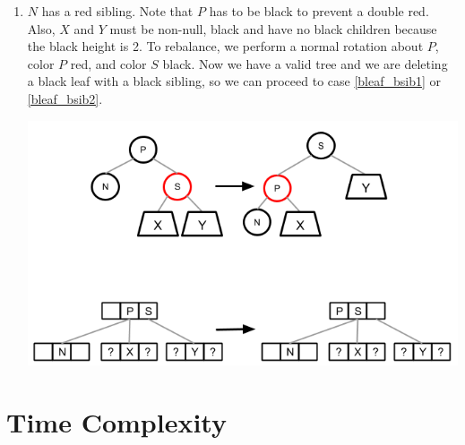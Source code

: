 \documentclass[12pt]{article}
\begin{document}
\begin{enumerate}
\begin{enumerate}
    \item $N$ has a red sibling. Note that $P$ has to be black to prevent a double red. Also, $X$ and $Y$ must be non-null, black and have no black children because the black height is 2. To rebalance, we perform a normal rotation about $P$, color $P$ red, and color $S$ black. Now we have a valid tree and we are deleting a black leaf with a black sibling, so we can proceed to case \ref{bleaf_bsib1} or \ref{bleaf_bsib2}.
    \begin{center}
      \includegraphics[scale=0.55]{pics/red_black_tree/del_bleaf_rsib}
    \end{center}

\end{enumerate}
\end{enumerate}

\section*{Time Complexity}
\end{document}
